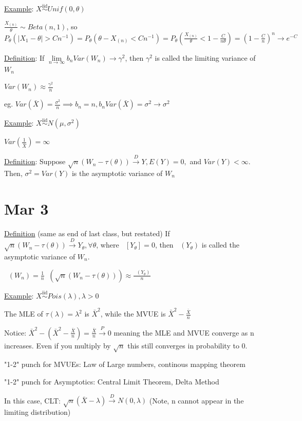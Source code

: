 \documentclass{article}
\DeclareMathOperator{\EX}{\mathbb{E}} %
\DeclareMathOperator{\ext}{\EX_{\theta}} %
\DeclareMathOperator{\vart}{Var_{\theta}} %
\newcommand{\pto}{\overset{P}{\to}}
\newcommand{\dto}{\overset{D}{\to}}
\let\Oldlim=\lim
\renewcommand{\lim}{\Oldlim\limits}
\newcommand{\iiddist}{\overset{\mathrm{iid}}{\sim}}
\begin{document}
\underline{Example}: $X \iiddist Unif(0, \theta)$

$\frac{X_{(n)}}{\theta} \sim Beta(n, 1)$, so $P_{\theta}(|X_1 - \theta| > Cn^{-1}) = P_{\theta}(\theta - X_{(n)} < C n^{-1}) = P_{\theta}(\frac{X_{(n)}}{\theta} < 1 - \frac{C}{n\theta}) = (1 - \frac{C}{n})^n \to e^{-C}$


\underline{Definition}: If $\lim_{n\to\infty} b_n Var(W_n) \to \gamma^2$, then $\gamma^2$ is called the limiting variance of $W_n$

$Var(W_n) \approx \frac{\gamma^2}{n}$

eg. $Var(\bar{X}) = \frac{\sigma^2}{n} \implies b_n = n, b_n Var(\bar{X}) = \sigma^2 \to \sigma^2$

\underline{Example}: $X \iiddist N(\mu, \sigma^2)$

$Var(\frac{1}{\bar{X}}) = \infty$

\underline{Definition}: Suppose $\sqrt{n}(W_n - \tau(\theta)) \dto Y, E(Y) = 0,$ and $Var(Y) < \infty$. Then, $\sigma^2 = Var(Y)$ is the asymptotic variance of $W_n$


\section{Mar 3}

\underline{Definition} (same as end of last class, but restated) If $\sqrt{n}(W_n - \tau(\theta)) \dto Y_{\theta}, \forall \theta$, where $\ext[Y_{\theta}] = 0$, then $\vart(Y_{\theta})$ is called the asymptotic variance of $W_n$.

$\vart(W_n) = \frac{1}{n}\vart(\sqrt{n}(W_n - \tau(\theta))) \approx \frac{\vart(Y_{\theta})}{n}$

\underline{Example}: $X \iiddist Pois(\lambda), \lambda > 0$

The MLE of $\tau(\lambda) = \lambda^2$ is $\bar{X}^2$, while the MVUE is $\bar{X}^2 - \frac{\bar{X}}{n}$

Notice: $\bar{X}^2 - (\bar{X}^2 - \frac{\bar{X}}{n}) = \frac{\bar{X}}{n} \pto 0$ meaning the MLE and MVUE converge as n increases. Even if you multiply by $\sqrt{n}$ this still converges in probability to 0. 

"1-2" punch for MVUEs: Law of Large numbers, continous mapping theorem

"1-2" punch for Asymptotics: Central Limit Theorem, Delta Method

In this case, CLT: $\sqrt{n}(\bar{X} - \lambda) \dto N(0, \lambda)$ (Note, n cannot appear in the limiting distribution)
\end{document}
